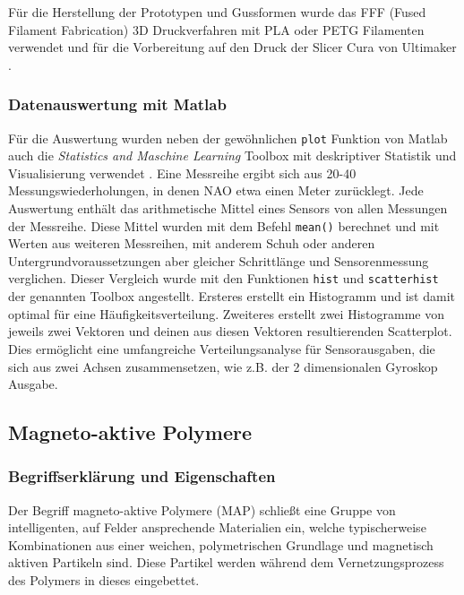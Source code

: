 Für die Herstellung der Prototypen und Gussformen wurde das FFF (Fused Filament Fabrication) 3D Druckverfahren mit PLA oder PETG Filamenten verwendet und für die Vorbereitung auf den Druck der Slicer Cura von Ultimaker \cite{cura}.

\subsubsection*{Datenauswertung mit Matlab}
Für die Auswertung wurden neben der gewöhnlichen \texttt{plot} Funktion von Matlab \cite{matlab} auch die \textit{Statistics and Maschine Learning} Toolbox mit deskriptiver Statistik und Visualisierung verwendet \cite{toolbox}. 
Eine Messreihe ergibt sich aus 20-40 Messungswiederholungen, in denen NAO etwa einen Meter zurücklegt. Jede Auswertung enthält das arithmetische Mittel eines Sensors von allen Messungen der Messreihe. Diese Mittel wurden mit dem Befehl \texttt{mean()} berechnet und mit Werten aus weiteren Messreihen, mit anderem Schuh oder anderen Untergrundvoraussetzungen aber gleicher Schrittlänge und Sensorenmessung verglichen. Dieser Vergleich wurde mit den Funktionen \texttt{hist} und \texttt{scatterhist} der genannten Toolbox angestellt. Ersteres erstellt ein Histogramm und ist damit optimal für eine Häufigkeitsverteilung. Zweiteres erstellt zwei Histogramme von jeweils zwei Vektoren und deinen aus diesen Vektoren resultierenden Scatterplot. Dies ermöglicht eine umfangreiche Verteilungsanalyse für Sensorausgaben, die sich aus zwei Achsen zusammensetzen, wie z.B. der 2 dimensionalen Gyroskop Ausgabe.

\FloatBarrier
\subsection{Magneto-aktive Polymere}\label{kap_MAP}
\subsubsection*{Begriffserklärung und Eigenschaften}
Der Begriff magneto-aktive Polymere (MAP) schließt eine Gruppe von intelligenten, auf Felder ansprechende Materialien ein, welche typischerweise Kombinationen aus einer weichen, polymetrischen Grundlage und magnetisch aktiven Partikeln sind. Diese Partikel werden während dem Vernetzungsprozess des Polymers in dieses eingebettet. 

